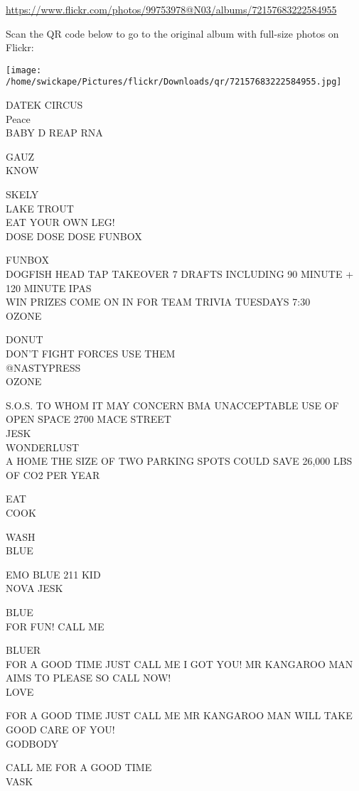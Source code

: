 \documentclass[10pt,letterpaper]{article}
\begin{document}
\url{https://www.flickr.com/photos/99753978@N03/albums/72157683222584955}

Scan the QR code below to go to the original album with full-size photos on Flickr:

\texttt{[image: /home/swickape/Pictures/flickr/Downloads/qr/72157683222584955.jpg]}


DATEK CIRCUS\\
Peace\\
BABY D REAP RNA

GAUZ\\
KNOW

SKELY\\
LAKE TROUT\\
EAT YOUR OWN LEG!\\
DOSE DOSE DOSE FUNBOX

FUNBOX\\
DOGFISH HEAD TAP TAKEOVER 7 DRAFTS INCLUDING 90 MINUTE + 120 MINUTE IPAS\\
WIN PRIZES COME ON IN FOR TEAM TRIVIA TUESDAYS 7:30\\
OZONE

DONUT\\
DON'T FIGHT FORCES USE THEM\\
@NASTYPRESS\\
OZONE

S.O.S. TO WHOM IT MAY CONCERN BMA UNACCEPTABLE USE OF OPEN SPACE 2700 MACE STREET\\
JESK\\
WONDERLUST\\
A HOME THE SIZE OF TWO PARKING SPOTS COULD SAVE 26,000 LBS OF CO2 PER YEAR

EAT\\
COOK

WASH\\
BLUE

EMO BLUE 211 KID\\
NOVA JESK

BLUE\\
FOR FUN!  CALL ME

BLUER\\
FOR A GOOD TIME JUST CALL ME I GOT YOU!  MR KANGAROO MAN AIMS TO PLEASE SO CALL NOW!\\
LOVE

FOR A GOOD TIME JUST CALL ME MR KANGAROO MAN WILL TAKE GOOD CARE OF YOU!\\
GODBODY

CALL ME FOR A GOOD TIME\\
VASK
\end{document}
